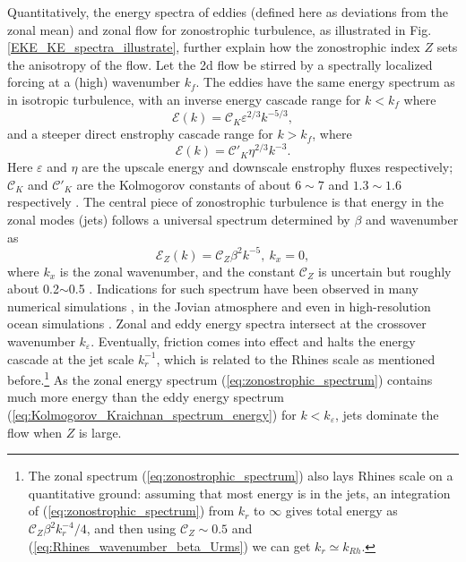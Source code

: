 \documentclass{ametsoc}
\begin{document}
Quantitatively, the energy spectra of eddies (defined here as deviations
from the zonal mean) and zonal flow for zonostrophic turbulence, as 
illustrated in Fig. \ref{EKE_KE_spectra_illustrate}, further
explain how the zonostrophic index $Z$ sets the anisotropy of the flow. 
Let the 2d flow be stirred by a spectrally localized forcing at a (high) wavenumber $k_{f}$.
The eddies have the same energy spectrum as in isotropic turbulence,
with an inverse energy cascade range for $k<k_f$ where
\begin{equation}
    \mathcal{E}(k)=\mathcal{C}_K\varepsilon^{2/3}k^{-5/3},\label{eq:Kolmogorov_Kraichnan_spectrum_energy}
\end{equation}
and a steeper direct enstrophy cascade range for $k>k_f$, where
\begin{equation}
    \mathcal{E}(k)=\mathcal{C'}_K\eta^{2/3}k^{-3}.\label{eq:Kolmogorov_Kraichnan_spectrum_enstrophy}
\end{equation}
Here $\varepsilon$ and $\eta$ are the upscale energy and downscale enstrophy
fluxes respectively; $\mathcal{C}_K$ and $\mathcal{C'}_K$ 
are the Kolmogorov constants of about $6\sim7$ and $1.3\sim1.6$ respectively
\citep{Maltrud1991,Smith1993,Paret1997,Chen2006,Borue1993,Gotoh1998}.
The central piece of zonostrophic turbulence is that 
energy in the zonal modes (jets) follows a universal spectrum determined
by $\beta$ and wavenumber as
\begin{equation}
\mathcal{E}_{Z}(k)=\mathcal{C}_Z\beta^{2}k^{-5},\ k_{x}=0,\label{eq:zonostrophic_spectrum}
\end{equation}
where $k_{x}$ is the zonal wavenumber, and the constant $\mathcal{C}_Z$
is uncertain but roughly about 0.2$\sim$0.5 \citep{Sukoriansky2002,Galperin2010,Smith2005}.
Indications for such spectrum have been observed in many numerical simulations 
\citep{Chekhlov1996,Smith2002,Huang2001,Sukoriansky2002,Sukoriansky2007},
in the Jovian atmosphere \citep{Sukoriansky2002,Choi2011,Galperin2014}
and even in high-resolution ocean simulations \citep{Galperin2004}.
Zonal and eddy energy spectra intersect at the crossover wavenumber $k_{\varepsilon}$.
Eventually, friction comes into effect and halts the energy 
cascade at the jet scale $k_r^{-1}$,
which is related to the Rhines scale as mentioned before.\footnote{
The zonal spectrum (\ref{eq:zonostrophic_spectrum})
also lays Rhines scale on a quantitative ground: assuming
that most energy is in the jets, an integration of (\ref{eq:zonostrophic_spectrum}) 
from $k_{r}$ to $\infty$ gives total energy as $\mathcal{C}_Z\beta^{2}k_{r}^{-4}/4$,
and then using $\mathcal{C}_Z\sim 0.5$ and (\ref{eq:Rhines_wavenumber_beta_Urms})
we can get $k_{r}\simeq k_{Rh}$.}
As the zonal energy spectrum (\ref{eq:zonostrophic_spectrum}) 
contains much more energy than the eddy energy spectrum 
(\ref{eq:Kolmogorov_Kraichnan_spectrum_energy}) for $k<k_\varepsilon$,
jets dominate the flow when $Z$ is large.
\end{document}

